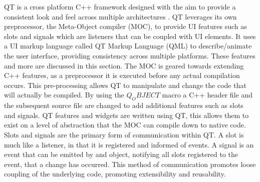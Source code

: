 QT is a cross platform C++ framework designed with the aim to provide a consistent look and feel across multiple architectures \cite{qt_about}. QT leverages its own preprocessor, the Meta-Object compiler (MOC), to provide UI features such as slots and signals which are listeners that can be coupled with UI elements. It uses a UI markup language called QT Markup Language (QML) to describe/animate the user interface, providing consistency across multiple platforms. These features and more are discussed in this section.
  The MOC is geared towards extending C++ features, as a preprocessor it is executed before any actual compilation occurs\cite{qt_moc}. This pre-processing allows QT to manipulate and change the code that will actually be compiled. By using the $Q_OBJECT$ macro a C++ header file and the subsequent source file are changed to add additional features such as slots and signals. QT features and widgets are written using QT, this allows them to exist on a level of abstraction that the MOC can compile down to native code.
  Slots and signals are the primary form of communication within QT\cite{qt_slotsnsignals}. A slot is much like a listener, in that it is registered and informed of events. A signal is an event that can be emitted by and object, notifying all slots registered to the event, that a change has occurred. This method of communication promotes loose coupling of the underlying code, promoting extensibility and reusability.


